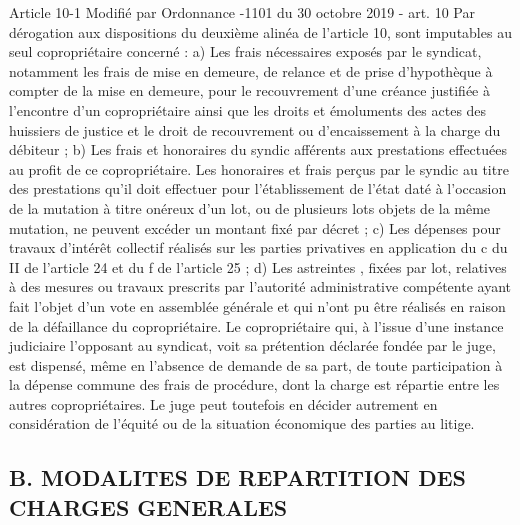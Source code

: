 		Article 10-1 Modifié par Ordonnance -1101 du 30 octobre 2019 - art. 10 Par dérogation aux dispositions du deuxième alinéa de l'article 10, sont imputables au seul copropriétaire concerné : a) Les frais nécessaires exposés par le syndicat, notamment les frais de mise en demeure, de relance et de prise d'hypothèque à compter de la mise en demeure, pour le recouvrement d'une créance justifiée à l'encontre d'un copropriétaire ainsi que les droits et émoluments des actes des huissiers de justice et le droit de recouvrement ou d'encaissement à la charge du débiteur ; b) Les frais et honoraires du syndic afférents aux prestations effectuées au profit de ce copropriétaire. Les honoraires et frais perçus par le syndic au titre des prestations qu'il doit effectuer pour l'établissement de l'état daté à l'occasion de la mutation à titre onéreux d'un lot, ou de plusieurs lots objets de la même mutation, ne peuvent excéder un montant fixé par décret ; c) Les dépenses pour travaux d'intérêt collectif réalisés sur les parties privatives en application du c du II de l'article 24 et du f de l'article 25 ; d) Les astreintes , fixées par lot, relatives à des mesures ou travaux prescrits par l'autorité administrative compétente ayant fait l'objet d'un vote en assemblée générale et qui n'ont pu être réalisés en raison de la défaillance du copropriétaire. Le copropriétaire qui, à l'issue d'une instance judiciaire l'opposant au syndicat, voit sa prétention déclarée fondée par le juge, est dispensé, même en l'absence de demande de sa part, de toute participation à la dépense commune des frais de procédure, dont la charge est répartie entre les autres copropriétaires. Le juge peut toutefois en décider autrement en considération de l'équité ou de la situation économique des parties au litige.
	
	\subsection{B. MODALITES DE REPARTITION DES CHARGES GENERALES}
	
